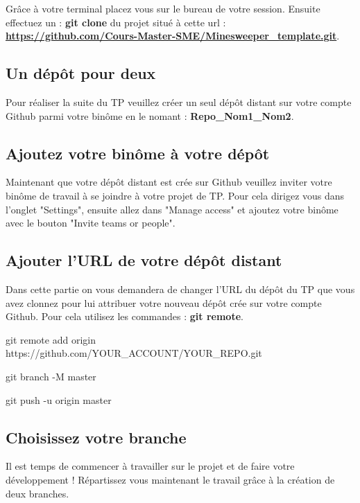 \noindent Grâce à votre terminal placez vous sur le bureau de votre session. Ensuite effectuez un : \textbf{git clone} du projet situé à cette url : \textbf{\href{https://github.com/Cours-Master-SME/Minesweeper\_template.git}{https://github.com/Cours-Master-SME/Minesweeper\_template.git}}.

\subsection{Un dépôt pour deux}

\noindent Pour réaliser la suite du TP veuillez créer un seul dépôt distant sur votre compte Github parmi votre binôme en le nomant : \textbf{Repo\_Nom1\_Nom2}. 

\subsection{Ajoutez votre binôme à votre dépôt}

\noindent Maintenant que votre dépôt distant est crée sur Github veuillez inviter votre binôme de travail à se joindre à votre projet de TP. Pour cela dirigez vous dans l'onglet "Settings", ensuite allez dans "Manage access" et ajoutez votre binôme avec le bouton "Invite teams or people".

\subsection{Ajouter l'URL de votre dépôt distant}

\noindent Dans cette partie on vous demandera de changer l'URL du dépôt du TP que vous avez clonnez pour lui attribuer votre nouveau dépôt crée sur votre compte Github. Pour cela utilisez les commandes : \textbf{git remote}.

\medskip

\noindent git remote add origin https://github.com/YOUR\_ACCOUNT/YOUR\_REPO.git 

\noindent git branch -M master

\noindent git push -u origin master

\subsection{Choisissez votre branche}

\noindent Il est temps de commencer à travailler sur le projet et de faire votre développement ! Répartissez vous maintenant le travail grâce à la création de deux branches. 

